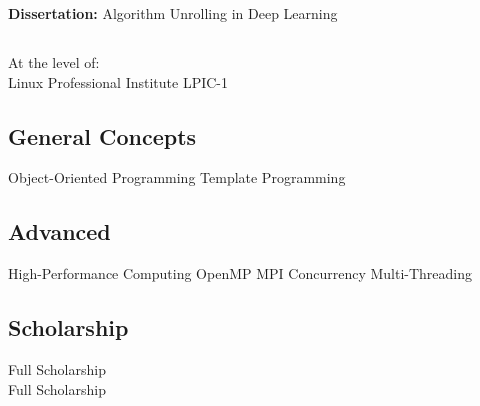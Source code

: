 \documentclass[a4paper]{MagicalCV}
\begin{document}
\begin{minipage}[t]{0.33\textwidth}

\textbf{Dissertation: }
Algorithm Unrolling in Deep Learning
\sectionsep


\subsection{}
At the level of:\\Linux Professional Institute LPIC-1  
\sectionsep


\subsection{General Concepts}
Object-Oriented Programming \textbullet{} Template Programming \textbullet{}  
\sectionsep
\subsection{Advanced}
High-Performance Computing \textbullet{} \textbullet{} OpenMP \textbullet{} MPI \textbullet{} Concurrency \textbullet{} Multi-Threading \textbullet{}
\sectionsep


\subsection{Scholarship}
\vspace{\topsep} %
Full Scholarship\\
\vspace{\topsep} %
Full Scholarship\\
\sectionsep


\end{minipage} 
\hfill
\end{document}
